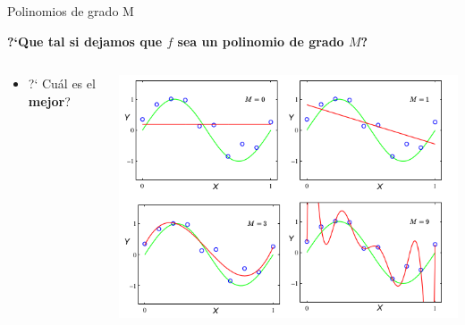 \documentclass[11pt]{beamer}
\begin{document}
\begin{frame}{Polinomios de  grado M}
		
\textbf{?`Que tal si dejamos que $f$ sea un polinomio de grado $M$?}

\vspace{0.3cm}

\begin{columns}
\begin{column}{0.3\textwidth}
			
\begin{itemize}
	\item ?` Cu\'al es el \textbf{mejor}?
\end{itemize}
	\end{column}
	\begin{column}{0.7\textwidth}  
		\includegraphics[scale= 0.35]{TA2.png}
	\end{column}
\end{columns}

\end{frame}
\end{document}
